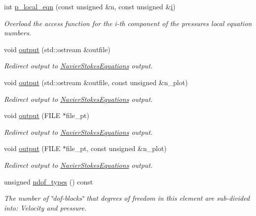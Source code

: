 \begin{DoxyCompactItemize}
int \hyperlink{classoomph_1_1LinearisedAxisymmetricQCrouzeixRaviartElement_ad3249306342a5b2be80bf0b73c7d2fca}{p\+\_\+local\+\_\+eqn} (const unsigned \&n, const unsigned \&\hyperlink{cfortran_8h_adb50e893b86b3e55e751a42eab3cba82}{i})
\begin{DoxyCompactList}\small\item\em Overload the access function for the i-\/th component of the pressure\textquotesingle{}s local equation numbers. \end{DoxyCompactList}\item 
void \hyperlink{classoomph_1_1LinearisedAxisymmetricQCrouzeixRaviartElement_ae89fb3e2f320a51ef7904b09a480ee89}{output} (std\+::ostream \&outfile)
\begin{DoxyCompactList}\small\item\em Redirect output to \hyperlink{classoomph_1_1NavierStokesEquations}{Navier\+Stokes\+Equations} output. \end{DoxyCompactList}\item 
void \hyperlink{classoomph_1_1LinearisedAxisymmetricQCrouzeixRaviartElement_a332ee735b33a99dae78a799f369b3069}{output} (std\+::ostream \&outfile, const unsigned \&n\+\_\+plot)
\begin{DoxyCompactList}\small\item\em Redirect output to \hyperlink{classoomph_1_1NavierStokesEquations}{Navier\+Stokes\+Equations} output. \end{DoxyCompactList}\item 
void \hyperlink{classoomph_1_1LinearisedAxisymmetricQCrouzeixRaviartElement_a36138cdd6b03f179d648edeb0b0b31e1}{output} (F\+I\+LE $\ast$file\+\_\+pt)
\begin{DoxyCompactList}\small\item\em Redirect output to \hyperlink{classoomph_1_1NavierStokesEquations}{Navier\+Stokes\+Equations} output. \end{DoxyCompactList}\item 
void \hyperlink{classoomph_1_1LinearisedAxisymmetricQCrouzeixRaviartElement_a72a580ae5281b5e5d88e656194cbf7b1}{output} (F\+I\+LE $\ast$file\+\_\+pt, const unsigned \&n\+\_\+plot)
\begin{DoxyCompactList}\small\item\em Redirect output to \hyperlink{classoomph_1_1NavierStokesEquations}{Navier\+Stokes\+Equations} output. \end{DoxyCompactList}\item 
unsigned \hyperlink{classoomph_1_1LinearisedAxisymmetricQCrouzeixRaviartElement_a3626eb04e30bef2ff695cb6c58dc59ba}{ndof\+\_\+types} () const
\begin{DoxyCompactList}\small\item\em The number of \char`\"{}dof-\/blocks\char`\"{} that degrees of freedom in this element are sub-\/divided into\+: Velocity and pressure. \end{DoxyCompactList}\end{DoxyCompactItemize}
